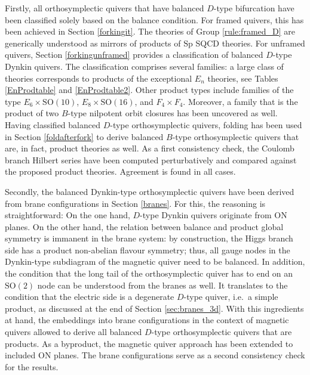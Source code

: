 \documentclass[a4paper,11pt]{article}
\newcommand{\sprm}{\mathrm{Sp}}
\newcommand{\sorm}{\mathrm{SO}}
\begin{document}
Firstly, all orthosymplectic quivers that have balanced $D$-type bifurcation have been classified solely based on the balance condition. For framed quivers, this has been achieved in Section \ref{forkingit}. The theories of Group \ref{rule:framed_D} are generically understood as mirrors of products of $\sprm$ SQCD theories. For unframed quivers, Section \ref{forkingunframed} provides a classification of balanced $D$-type Dynkin quivers. The classification comprises several families: a large class of theories corresponds to products of the exceptional $E_n$ theories, see Tables \ref{EnProdtable} and \ref{EnProdtable2}.  Other product types include families of the type $E_6 \times \sorm(10)$, $E_8 \times \sorm(16) $, and $F_4\times F_4$.  Moreover, a family that is the product of two $B$-type nilpotent orbit closures has been uncovered as well.
% 
Having classified balanced $D$-type orthosymplectic quivers, folding has been used in Section \ref{foldafterfork} to derive balanced $B$-type orthosymplectic quivers that are, in fact, product theories as well. As a first consistency check, the Coulomb branch Hilbert series have been computed perturbatively and compared against the proposed product theories. Agreement is found in all cases.

Secondly, the balanced Dynkin-type orthosymplectic quivers have been derived from brane configurations in Section \ref{branes}. For this, the reasoning is straightforward: On the one hand, $D$-type Dynkin quivers originate from ON planes. On the other hand, the relation between balance and product global symmetry is immanent in the brane system: by construction, the Higgs branch side has a product non-abelian flavour symmetry; thus, all gauge nodes in the Dynkin-type subdiagram of the magnetic quiver need to be balanced. In addition, the condition that the long tail of the orthosymplectic quiver has to end on an $\sorm(2)$ node can be understood from the branes as well. It translates to the condition that the electric side is a degenerate $D$-type quiver, i.e.\ a simple product, as discussed at the end of Section \ref{sec:branes_3d}. With this ingredients at hand, the embeddings into brane configurations in the context of magnetic quivers allowed to derive all balanced $D$-type orthosymplectic quivers that are products.  As a byproduct, the magnetic quiver approach has been extended to included ON planes. The brane configurations serve as a second consistency check for the results.
\end{document}
